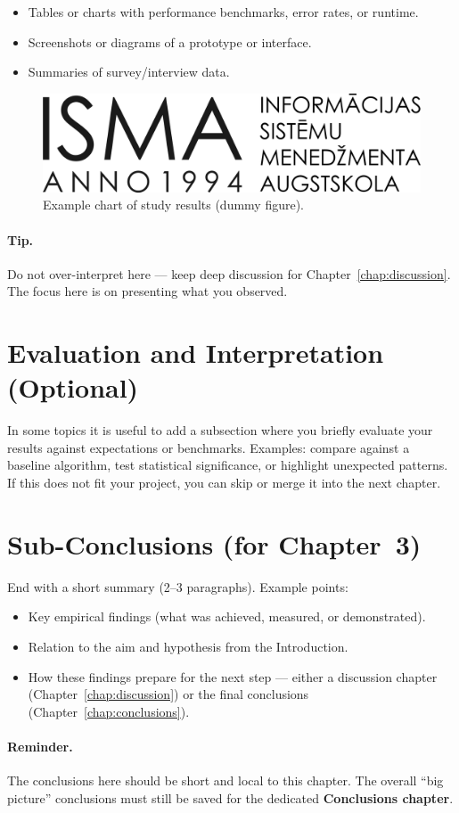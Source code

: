 \begin{itemize}[leftmargin=1.2cm]
  \item Tables or charts with performance benchmarks, error rates, or runtime.  
  \item Screenshots or diagrams of a prototype or interface.  
  \item Summaries of survey/interview data.  
\end{itemize}

\begin{figure}[h]
  \centering
  \includegraphics[width=0.6\linewidth]{b_chapters/chapter1/assets/isma_logo.png}
  \caption{Example chart of study results (dummy figure).}
  \label{fig:study-results}
\end{figure}

\paragraph{Tip.} Do not over-interpret here — keep deep discussion for Chapter~\ref{chap:discussion}.  
The focus here is on presenting what you observed.

\section{Evaluation and Interpretation (Optional)}
\label{sec:evaluation}
In some topics it is useful to add a subsection where you briefly evaluate your results against expectations or benchmarks.  
Examples: compare against a baseline algorithm, test statistical significance, or highlight unexpected patterns.  
If this does not fit your project, you can skip or merge it into the next chapter.

\section{Sub-Conclusions (for Chapter~3)}
\label{sec:subconcl3}
End with a short summary (2–3 paragraphs).  
Example points:

\begin{itemize}[leftmargin=1.2cm]
  \item Key empirical findings (what was achieved, measured, or demonstrated).  
  \item Relation to the aim and hypothesis from the Introduction.  
  \item How these findings prepare for the next step — either a discussion chapter (Chapter~\ref{chap:discussion}) or the final conclusions (Chapter~\ref{chap:conclusions}).  
\end{itemize}

\paragraph{Reminder.} The conclusions here should be short and local to this chapter. The overall “big picture” conclusions must still be saved for the dedicated \textbf{Conclusions chapter}.
